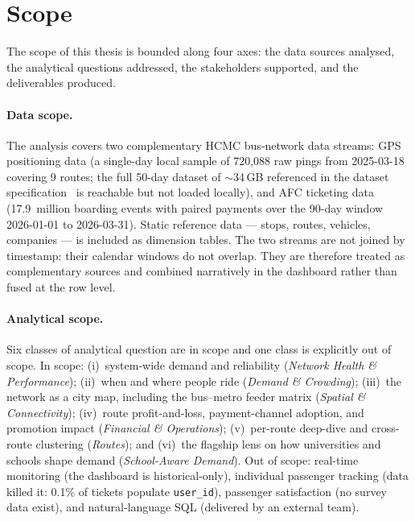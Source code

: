 \section{Scope}
\label{sec:intro:scope}

The scope of this thesis is bounded along four axes: the data
sources analysed, the analytical questions addressed, the
stakeholders supported, and the deliverables produced.

\paragraph{Data scope.}
The analysis covers two complementary HCMC bus-network data streams:
GPS positioning data (a single-day local sample of 720{,}088 raw
pings from 2025-03-18 covering 9 routes; the full 50-day dataset of
$\sim$34\,GB referenced in the dataset specification~\cite{hcmcgps2025}
is reachable but not loaded locally), and AFC ticketing data
(17.9~million boarding events with paired payments over the 90-day
window 2026-01-01 to 2026-03-31). Static reference data --- stops,
routes, vehicles, companies --- is included as dimension tables.
The two streams are not joined by timestamp: their calendar windows
do not overlap. They are therefore treated as complementary sources
and combined narratively in the dashboard rather than fused at the
row level.

\paragraph{Analytical scope.}
Six classes of analytical question are in scope and one class is
explicitly out of scope. In scope:
(i)~system-wide demand and reliability (\emph{Network Health \&
Performance});
(ii)~when and where people ride (\emph{Demand \& Crowding});
(iii)~the network as a city map, including the bus--metro feeder
matrix (\emph{Spatial \& Connectivity});
(iv)~route profit-and-loss, payment-channel adoption, and
promotion impact (\emph{Financial \& Operations});
(v)~per-route deep-dive and cross-route clustering
(\emph{Routes}); and (vi)~the flagship lens on how universities
and schools shape demand (\emph{School-Aware Demand}). Out of
scope: real-time monitoring (the dashboard is historical-only),
individual passenger tracking (data killed it: 0.1\% of tickets
populate \texttt{user\_id}), passenger satisfaction (no survey
data exist), and natural-language SQL (delivered by an external
team).

